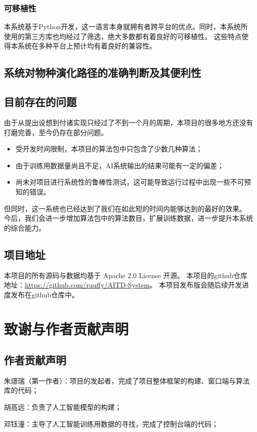 \documentclass{article}
\begin{document}
\begin{multicols}{2}
\subsubsection{可移植性}
\par
本系统基于Python开发，这一语言本身就拥有者跨平台的优点。同时，本系统所使用的第三方库也均经过了筛选，绝大多数都有着良好的可移植性。
这些特点使得本系统在多种平台上预计均有着良好的兼容性。

\subsection{系统对物种演化路径的准确判断及其便利性}

\subsection{目前存在的问题}
\par
由于从提出设想到付诸实现只经过了不到一个月的周期，本项目的很多地方还没有打磨完善，至今仍存在部分问题。
\par
\begin{itemize}
\item[1)] 受开发时间限制，本项目的算法包中只包含了少数几种算法；
\item[2)] 由于训练用数据量尚且不足，AI系统输出的结果可能有一定的偏差；
\item[3)] 尚未对项目进行系统性的鲁棒性测试，这可能导致运行过程中出现一些不可预知的错误。
\end{itemize}
\par
但同时，这一系统也已经达到了我们在如此短的时间内能够达到的最好的效果。
今后，我们会进一步增加算法包中的算法数目，扩展训练数据，进一步提升本系统的综合能力。

\subsection{项目地址}
\par
本项目的所有源码与数据均基于 Apache 2.0 License 开源。
本项目的github仓库地址：\href{https://github.com/ruufly/AITD-System}{https://github.com/ruufly/AITD-System}。
本项目发布版会随后续开发进度发布在github仓库中。

\section{致谢与作者贡献声明}

\subsection{作者贡献声明}
\par
朱璟瑞（第一作者）：项目的发起者，完成了项目整体框架的构建、窗口端与算法库的代码；
\par
胡高远：负责了人工智能模型的构建；
\par
邓钰潼：主导了人工智能训练用数据的寻找，完成了控制台端的代码；


\end{multicols}
\end{document}
